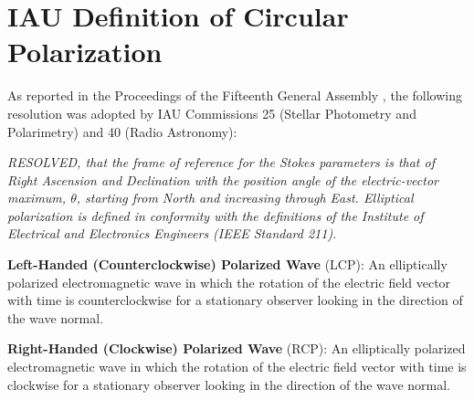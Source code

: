 \documentclass[letterpaper,11pt]{book}
\begin{document}
\section{IAU Definition of Circular Polarization}

As reported in the Proceedings of the Fifteenth General Assembly \cite{IAU1974},
the following resolution was adopted by IAU Commissions 25 (Stellar Photometry
and Polarimetry) and 40 (Radio Astronomy):

{\itshape RESOLVED, that the frame of reference for the Stokes parameters is
that of Right Ascension and Declination with the position angle of the
electric-vector maximum, $\theta$, starting from North and increasing through
East. Elliptical polarization is defined in conformity with the definitions of
the Institute of Electrical and Electronics Engineers
(IEEE Standard 211)}\cite{IEEE1969}.

{\bfseries Left-Handed (Counterclockwise) Polarized Wave} (LCP):
An elliptically polarized electromagnetic wave in which the
rotation of the electric field vector with time is
counterclockwise for a stationary observer looking in the
direction of the wave normal.

{\bfseries Right-Handed (Clockwise) Polarized Wave} (RCP): 
An elliptically polarized electromagnetic wave in which the
rotation of the electric field vector with time is clockwise
for a stationary observer looking in the direction of the wave
normal.
\end{document}
